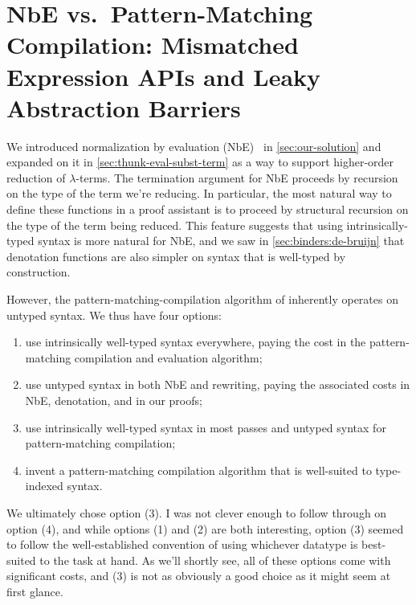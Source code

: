\section{NbE vs.\ Pattern-Matching Compilation: Mismatched Expression APIs and Leaky Abstraction Barriers}\label{sec:rewriting-more:AST:choices}
We introduced normalization by evaluation (NbE)~\cite{NbE} in \autoref{sec:our-solution} and expanded on it in \autoref{sec:thunk-eval-subst-term} as a way to support higher-order reduction of $\lambda$-terms.
The termination argument for NbE proceeds by recursion on the type of the term we're reducing.
In particular, the most natural way to define these functions in a proof assistant is to proceed by structural recursion on the type of the term being reduced.
This feature suggests that using intrinsically-typed syntax is more natural for NbE, and we saw in \autoref{sec:binders:de-bruijn} that denotation functions are also simpler on syntax that is well-typed by construction.

However, the pattern-matching-compilation algorithm of \textcite{maranget2008compiling} inherently operates on untyped syntax.
We thus have four options:
\begin{enumerate}[(1)]
\item
  use intrinsically well-typed syntax everywhere, paying the cost in the pattern-matching compilation and evaluation algorithm;
\item
  use untyped syntax in both NbE and rewriting, paying the associated costs in NbE, denotation, and in our proofs;
\item
  use intrinsically well-typed syntax in most passes and untyped syntax for pattern-matching compilation;
\item
  invent a pattern-matching compilation algorithm that is well-suited to type-indexed syntax.
\end{enumerate}
We ultimately chose option (3).
I was not clever enough to follow through on option (4), and while options (1) and (2) are both interesting, option (3) seemed to follow the well-established convention of using whichever datatype is best-suited to the task at hand.
As we'll shortly see, all of these options come with significant costs, and (3) is not as obviously a good choice as it might seem at first glance.

